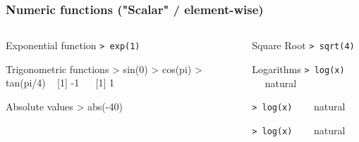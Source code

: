 \documentclass[ucs]{beamer}
\begin{document}
 \begin{frame}
  \frametitle{Numeric functions ("Scalar" / element-wise)}
    \begin{columns}[T]
    \begin{column}{0.5\textwidth}
      \begin{block}{Exponential function}
\texttt{> exp(1)} 
      \end{block}
  
  \begin{block}{Trigonometric functions }
\footnotesize \ttfamily>\! sin(0) >\! cos(pi) >\! tan(pi/4)  ~  [1] -1 ~~  [1] 1
    \end{block}
    \begin{block}{Absolute values}
\ttfamily > abs(-40) 
  \end{block}    
  
  
    \end{column}
    \begin{column}{0.5\textwidth}
      
        \begin{block}{Square Root}
        \texttt{> sqrt(4)}
      \end{block}

\begin{block}{Logarithms}
\texttt{> log(x) } ~~ natural \newline

\texttt{> log(x) } ~~ natural \newline

\texttt{> log(x) } ~~ natural \newline
\end{block}    


      
    \end{column}
  \end{columns}
\end{frame}
\end{document}
